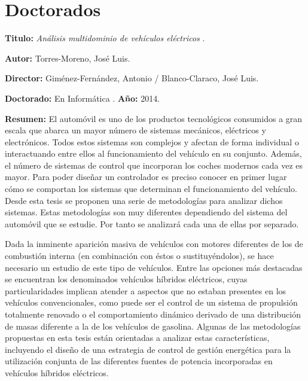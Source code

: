 \section{Doctorados}
\textbf{Titulo:} \textit{Análisis multidominio de vehículos eléctricos} \cite{torres2014UALeCARM}.

\textbf{Autor:} Torres-Moreno, José Luis.

\textbf{Director:} Giménez-Fernández, Antonio / Blanco-Claraco, José Luis.

\textbf{Doctorado:} En Informática . \textbf{Año:} 2014. 

 
\textbf{Resumen:} El automóvil es uno de los productos tecnológicos consumidos a gran escala que abarca un mayor número de sistemas mecánicos, eléctricos y electrónicos. Todos estos sistemas son complejos y afectan de forma individual o interactuando entre ellos al funcionamiento del vehículo en su conjunto. Además, el número de sistemas de control que incorporan los coches modernos cada vez es mayor. Para poder diseñar un controlador es preciso conocer en primer lugar cómo se comportan los sistemas que determinan el funcionamiento del vehículo. Desde esta tesis se proponen una serie de metodologías para analizar dichos sistemas. Estas metodologías son muy diferentes dependiendo del sistema del automóvil que se estudie. Por tanto se analizará cada una de ellas por separado.

Dada la inminente aparición masiva de vehículos con motores diferentes de los de combustión interna (en combinación con éstos o sustituyéndolos), se hace necesario un estudio de este tipo de vehículos. Entre las opciones más destacadas se encuentran los denominados vehículos híbridos eléctricos, cuyas particularidades implican atender a aspectos que no estaban presentes en los vehículos convencionales, como puede ser el control de un sistema de propulsión totalmente renovado o el comportamiento dinámico derivado de una distribución de masas diferente a la de los vehículos de gasolina. Algunas de las metodologías propuestas en esta tesis están orientadas a analizar estas características, incluyendo el diseño de una estrategia de control de gestión energética para la utilización conjunta de las diferentes fuentes de potencia incorporadas en vehículos híbridos eléctricos.

